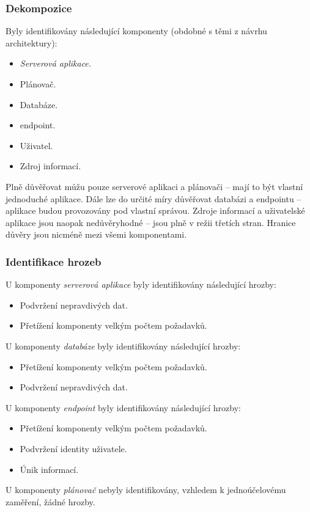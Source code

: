 \subsubsection{Dekompozice}
Byly identifikovány následující komponenty (obdobné s těmi z návrhu architektury):
\begin{itemize}
 \item \textit{Serverová aplikace.}
 \item Plánovač.
 \item Databáze.
 \item {} endpoint.
 \item Uživatel.
 \item Zdroj informací.
\end{itemize}
Plně důvěřovat můžu pouze serverové aplikaci a plánovači -- mají to být vlastní jednoduché aplikace. Dále lze do určité míry důvěřovat databázi a  endpointu -- aplikace budou provozovány pod vlastní správou. Zdroje informací a uživatelské aplikace jsou naopak nedůvěryhodné -- jsou plně v režii třetích stran. Hranice důvěry jsou nicméně mezi všemi komponentami.

\subsubsection{Identifikace hrozeb}
U komponenty \emph{serverová aplikace} byly identifikovány následující hrozby:
\begin{itemize}
 \item Podvržení nepravdivých dat.
 \item Přetížení komponenty velkým počtem požadavků.
\end{itemize}
U komponenty \emph{databáze} byly identifikovány následující hrozby:
\begin{itemize}
 \item Přetížení komponenty velkým počtem požadavků.
 \item Podvržení nepravdivých dat.
\end{itemize}
U komponenty \emph{ endpoint} byly identifikovány následující hrozby:
\begin{itemize}
 \item Přetížení komponenty velkým počtem požadavků.
 \item Podvržení identity uživatele.
 \item Únik informací.
\end{itemize}
U komponenty \emph{plánovač} nebyly identifikovány, vzhledem k jednoúčelovému zaměření, žádné hrozby.

